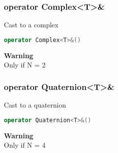 \subsubsection{operator Complex<T>\&}
\begin{mdframed}
Cast to a complex
\begin{lstlisting}[language=C++]
operator Complex<T>&()
\end{lstlisting}
\textbf{Warning} \\ 
Only if N = 2\\ 
\end{mdframed}

\subsubsection{operator Quaternion<T>\&}
\begin{mdframed}
Cast to a quaternion
\begin{lstlisting}[language=C++]
operator Quaternion<T>&()
\end{lstlisting}
\textbf{Warning} \\ 
Only if N = 4\\ 
\end{mdframed}

